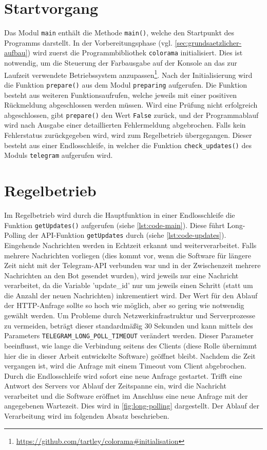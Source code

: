 \section{Startvorgang}
\label{sec:startvorgang}

Das Modul \lstinline{main} enthält die Methode \lstinline{main()}, welche den Startpunkt des Programms darstellt. In der Vorbereitungsphase (vgl. \autoref{sec:grundsaetzlicher-aufbau}) wird zuerst die Programmbibliothek \lstinline{colorama} initialisiert. Dies ist notwendig, um die Steuerung der Farbausgabe auf der Konsole an das zur Laufzeit verwendete Betriebssystem anzupassen\footnote{\url{https://github.com/tartley/colorama\#initialisation}}. Nach der Initialisierung wird die Funktion \lstinline{prepare()} aus dem Modul \lstinline{preparing} aufgerufen. Die Funktion besteht aus weiteren Funktionsaufrufen, welche jeweils mit einer positiven Rückmeldung abgeschlossen werden müssen. Wird eine Prüfung nicht erfolgreich abgeschlossen, gibt \lstinline{prepare()} den Wert \lstinline{False} zurück, und der Programmablauf wird nach Ausgabe einer detaillierten Fehlermeldung abgebrochen. Falls kein Fehlerstatus zurückgegeben wird, wird zum Regelbetrieb übergegangen. Dieser besteht aus einer Endlosschleife, in welcher die Funktion \lstinline{check_updates()} des Moduls \lstinline{telegram} aufgerufen wird.

\section{Regelbetrieb}

Im Regelbetrieb wird durch die Hauptfunktion in einer Endlosschleife die Funktion \lstinline{getUpdates()} aufgerufen (siehe \autoref{lst:code-main}). Diese führt Long-Polling der API-Funktion \lstinline{getUpdates} durch (siehe \autoref{lst:code-updates}). Eingehende Nachrichten werden in Echtzeit erkannt und weiterverarbeitet. Falls mehrere Nachrichten vorliegen (dies kommt vor, wenn die Software für längere Zeit nicht mit der Telegram-API verbunden war und in der Zwischenzeit mehrere Nachrichten an den Bot gesendet wurden), wird jeweils nur eine Nachricht verarbeitet, da die Variable 'update\_id' nur um jeweils einen Schritt (statt um die Anzahl der neuen Nachrichten) inkrementiert wird. Der Wert für den Ablauf der HTTP-Anfrage sollte so hoch wie möglich, aber so gering wie notwendig gewählt werden. Um Probleme durch Netzwerkinfrastruktur und Serverprozesse zu vermeiden, beträgt dieser standardmäßig 30 Sekunden \cite[Abs. 5.5. Timeouts]{rfc6202} und kann mittels des Parameters \lstinline{TELEGRAM_LONG_POLL_TIMEOUT} verändert werden. Dieser Parameter beeinflusst, wie lange die Verbindung seitens des Clients (diese Rolle übernimmt hier die in dieser Arbeit entwickelte Software) geöffnet bleibt. Nachdem die Zeit vergangen ist, wird die Anfrage mit einem Timeout vom Client abgebrochen. Durch die Endlosschleife wird sofort eine neue Anfrage gestartet. Trifft eine Antwort des Servers vor Ablauf der Zeitspanne ein, wird die Nachricht verarbeitet und die Software eröffnet im Anschluss eine neue Anfrage mit der angegebenen Wartezeit. Dies wird in \autoref{fig:long-polling} dargestellt. Der Ablauf der Verarbeitung wird im folgenden Absatz beschrieben.

